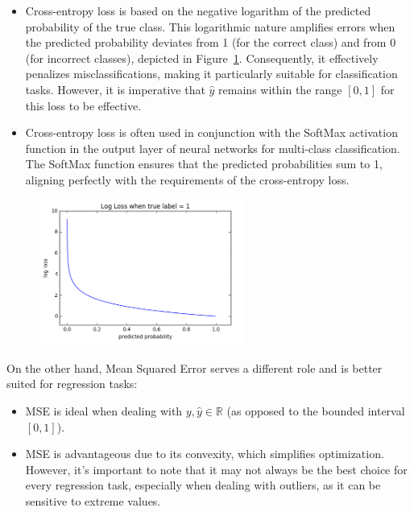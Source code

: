 \documentclass{article}
\theoremstyle{plain}%
\theoremstyle{definition}
\theoremstyle{remark}
\begin{document}
\begin{itemize}
    \item Cross-entropy loss is based on the negative logarithm of the predicted probability of the true class. This logarithmic nature amplifies errors when the predicted probability deviates from 1 (for the correct class) and from 0 (for incorrect classes), depicted in Figure~\ref{CELoss}. Consequently, it effectively penalizes misclassifications, making it particularly suitable for classification tasks. However, it is imperative that $\hat{y}$ remains within the range $[0, 1]$ for this loss to be effective.
    \item Cross-entropy loss is often used in conjunction with the SoftMax activation function in the output layer of neural networks for multi-class classification. The SoftMax function ensures that the predicted probabilities sum to 1, aligning perfectly with the requirements of the cross-entropy loss.
\end{itemize}

\begin{figure}[!htbp]
    \centering
    \includegraphics*[width=0.6\textwidth]{figs/cross_entropy.png}
    \label{CELoss}
\end{figure}

On the other hand, Mean Squared Error serves a different role and is better suited for regression tasks:

\begin{itemize}
    \item MSE is ideal when dealing with $y, \hat{y} \in \mathbb{R}$ (as opposed to the bounded interval $[0, 1]$).
    \item MSE is advantageous due to its convexity, which simplifies optimization. However, it's important to note that it may not always be the best choice for every regression task, especially when dealing with outliers, as it can be sensitive to extreme values.
\end{itemize}
\end{document}
